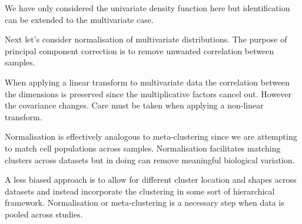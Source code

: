 We have only considered the univariate density function here but identification can be extended to the multivariate case.

Next let's consider normalisation of multivariate distributions.  
The purpose of principal component correction is to remove unwanted correlation between samples.

When applying a linear transform to multivariate data the correlation between the dimensions is preserved since the multiplicative factors cancel out.
However the covariance changes.
Care must be taken when applying a non-linear transform.  

Normalisation is effectively analogous to meta-clustering since we are attempting to match cell populations across samples.  
Normalisation facilitates matching clusters across datasets but in doing can remove meaningful biological variation.  


A less biased approach is to allow for different cluster location and shapes across datasets and instead incorporate the clustering in some sort of hierarchical framework.  
Normalisation or meta-clustering is a necessary step when data is pooled across studies.


